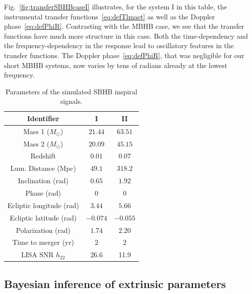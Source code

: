 \documentclass[aps,showpacs,twocolumn,prd,superscriptaddress,nofootinbib]{revtex4-1}
\newcommand{\Msol}{M_{\odot}}
\begin{document}
Fig.~\ref{fig:transferSBHBcaseI} illustrates, for the system I in this table, the instrumental transfer functions~\eqref{eq:defTlmaet} as well as the Doppler phase~\eqref{eq:defPhiR}. Contrasting with the MBHB case, we see that the transfer functions have much more structure in this case. Both the time-dependency and the frequency-dependency in the response lead to oscillatory features in the transfer functions. The Doppler phase~\eqref{eq:defPhiR}, that was negligible for our short MBHB systems, now varies by tens of radians already at the lowest frequency.


\begin{table}
	\begin{tabular}{|c||c|c|}
		\hline
		Identifier 		& I 	& II   \\
		\hline
		\hline
		Mass 1 ($\Msol$) 	& $21.44$ & $63.51$ \\
		\hline
		Mass 2 ($\Msol$) 	& $20.09$ & $45.15$ \\
		\hline
		Redshift 		& $0.01$ & $0.07$ \\
		\hline
		Lum. Distance (Mpc) 		&  $49.1$ & $318.2$\\
		\hline
		Inclination (rad) 		& $0.65$ & $1.92$ \\
		\hline
		Phase (rad) 			& $0$	& $0$ \\
		\hline
		Ecliptic longitude (rad) 			& $3.44$	& $5.66$ \\
		\hline
		Ecliptic latitude (rad) 			& $-0.074$	& $-0.055$ \\
		\hline
		Polarization (rad) 			& $1.74$	& $2.20$ \\
		\hline
		Time to merger (yr) 			& $2$	& $2$ \\
		\hline
		\hline
		LISA SNR $h_{22}$			& 26.6 & 11.9 \\
		\hline
	\end{tabular}
	\caption{Parameters of the simulated SBHB inspiral signals.}
	\label{tab:SBHBparams}
\end{table}


\subsection{Bayesian inference of extrinsic parameters}
\label{subsec:PESBHB}
\end{document}
